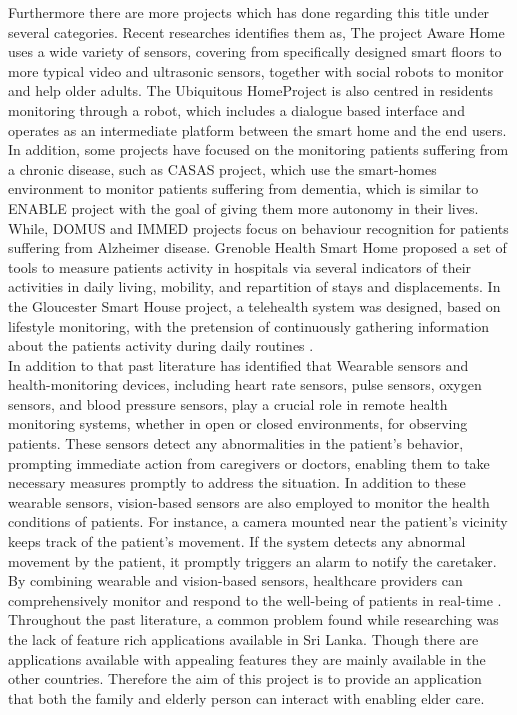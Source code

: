 Furthermore there are more projects which has done regarding this title under several categories. Recent researches identifies them as, The project Aware Home uses a wide variety of sensors, covering from specifically designed smart floors to more typical video and ultrasonic  sensors, together with social robots to monitor and help older adults. The Ubiquitous  HomeProject is also centred in residents monitoring through a robot, which includes a dialogue based interface and operates as an intermediate platform between the smart home and the end users. In addition, some projects have focused on the monitoring patients
suffering from a chronic disease, such as CASAS project, which use the smart-homes environment to monitor patients suffering from dementia, which is similar to ENABLE
project with the goal of giving them more autonomy in their lives. While, DOMUS and IMMED projects focus on behaviour recognition for patients suffering from Alzheimer disease. Grenoble Health Smart Home proposed a set of tools to measure patients activity in hospitals via several indicators of their activities in daily living, mobility, and repartition of stays and displacements. In the Gloucester Smart House project, a telehealth system was designed, based on lifestyle monitoring, with the pretension of continuously gathering information about the patients activity during daily routines \cite{RemoteHealth}. \\

In addition to that past literature has identified that Wearable sensors and health-monitoring devices, including heart rate sensors, pulse  sensors, oxygen sensors, and blood pressure sensors, play a crucial role in remote health monitoring systems, whether in open or closed environments, for observing patients. These sensors detect any abnormalities in the patient’s behavior, prompting immediate action from caregivers or doctors, enabling them to take necessary measures promptly to address the situation. In addition to these wearable sensors, vision-based sensors are also employed to monitor the health conditions of patients. For instance, a camera mounted near the patient’s vicinity keeps track of the patient’s movement. If the system detects any abnormal movement by the patient, it promptly triggers an alarm to notify the caretaker. By combining wearable and vision-based sensors, healthcare providers can comprehensively monitor and respond to the well-being of patients in real-time \cite{ASurvey}.\\

Throughout the past literature, a common problem found while researching was the lack of feature rich applications available in Sri Lanka. Though there are applications available with appealing features 
they are mainly available in the other countries. Therefore the aim of this project is to provide an application that both the family and elderly person can interact with enabling elder care.


\newpage